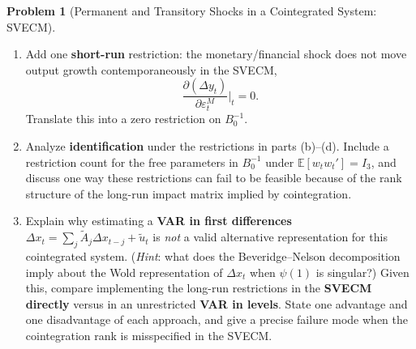 \documentclass[12pt]{article}
\newcommand{\E}{\mathbb E}
\theoremstyle{definition} %
\newtheorem{problem}{Problem}
\theoremstyle{plain}
\begin{document}
\begin{problem}[Permanent and Transitory Shocks in a Cointegrated System: SVECM]
\begin{enumerate}[label=(\alph*)]
\item Add one \textbf{short-run} restriction: the monetary/financial shock does not move output growth contemporaneously in the SVECM,
\[
\frac{\partial(\Delta y_t)}{\partial \varepsilon_t^M}\Big|_t = 0.
\]
Translate this into a zero restriction on $B_0^{-1}$.

\item Analyze \textbf{identification} under the restrictions in parts (b)--(d). Include a restriction count for the free parameters in $B_0^{-1}$ under $\E[w_t w_t'] = I_3$, and discuss one way these restrictions can fail to be feasible because of the rank structure of the long-run impact matrix implied by cointegration.

\item Explain why estimating a \textbf{VAR in first differences} $\Delta x_t = \sum_j \tilde{A}_j \Delta x_{t-j} + \tilde{u}_t$ is \emph{not} a valid alternative representation for this cointegrated system. (\emph{Hint}: what does the Beveridge--Nelson decomposition imply about the Wold representation of $\Delta x_t$ when $\psi(1)$ is singular?) Given this, compare implementing the long-run restrictions in the \textbf{SVECM directly} versus in an unrestricted \textbf{VAR in levels}. State one advantage and one disadvantage of each approach, and give a precise failure mode when the cointegration rank is misspecified in the SVECM.
\end{enumerate}
\end{problem}

\vspace{0.8em}
\end{document}
